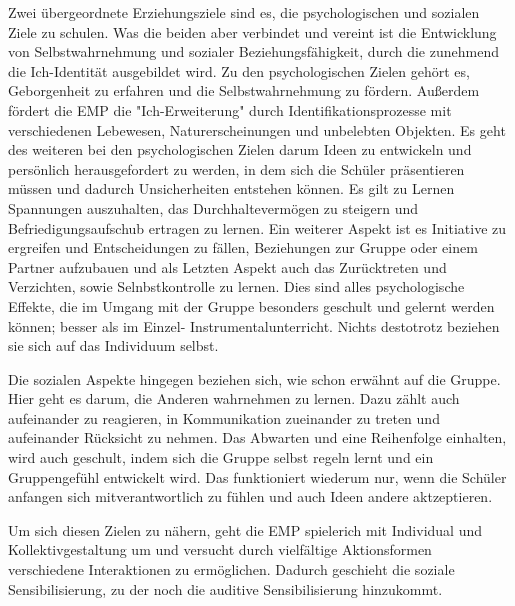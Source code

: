 Zwei übergeordnete Erziehungsziele sind es, die psychologischen und sozialen
Ziele zu schulen. Was die beiden aber verbindet und vereint ist die Entwicklung
von Selbstwahrnehmung und sozialer Beziehungsfähigkeit, durch die zunehmend die
Ich-Identität ausgebildet wird. Zu den psychologischen Zielen gehört es,
Geborgenheit zu erfahren und die Selbstwahrnehmung zu fördern. Außerdem fördert
die EMP die "Ich-Erweiterung" durch Identifikationsprozesse mit verschiedenen
Lebewesen, Naturerscheinungen und unbelebten Objekten. Es geht des weiteren bei
den psychologischen Zielen darum Ideen zu entwickeln und persönlich
herausgefordert zu werden, in dem sich die Schüler präsentieren müssen und
dadurch Unsicherheiten entstehen können. Es gilt zu Lernen Spannungen
auszuhalten, das Durchhaltevermögen zu steigern und Befriedigungsaufschub
ertragen zu lernen. Ein weiterer Aspekt ist es Initiative zu ergreifen und
Entscheidungen zu fällen, Beziehungen zur Gruppe oder einem Partner aufzubauen
und als Letzten Aspekt auch das Zurücktreten und Verzichten, sowie
Selnbstkontrolle zu lernen. Dies sind alles psychologische Effekte, die im
Umgang mit der Gruppe besonders geschult und gelernt werden können; besser als
im Einzel- Instrumentalunterricht. Nichts destotrotz beziehen sie sich auf das
Individuum selbst.

Die sozialen Aspekte hingegen beziehen sich, wie schon erwähnt auf die Gruppe.
Hier geht es darum, die Anderen wahrnehmen zu lernen. Dazu zählt auch
aufeinander zu reagieren, in Kommunikation zueinander zu treten und aufeinander
Rücksicht zu nehmen. Das Abwarten und eine Reihenfolge einhalten, wird auch
geschult, indem sich die Gruppe selbst regeln lernt und ein Gruppengefühl
entwickelt wird. Das funktioniert wiederum nur, wenn die Schüler anfangen sich
mitverantwortlich zu fühlen und auch Ideen andere aktzeptieren.

Um sich diesen Zielen zu nähern, geht die EMP spielerich mit Individual und
Kollektivgestaltung um und versucht durch vielfältige Aktionsformen verschiedene
Interaktionen zu ermöglichen. Dadurch geschieht die soziale Sensibilisierung, zu
der noch die auditive Sensibilisierung hinzukommt. 



